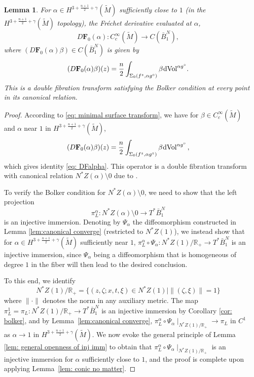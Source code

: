 \documentclass[11pt]{amsart}
\newtheorem{Lemma}[Theorem]{Lemma}
\theoremstyle{definition}
\numberwithin{equation}{section}
\newcommand{\mR}{\mathbb{R}}                    %
\newcommand{\s}{\hspace{0.5pt}}
\begin{document}
\begin{Lemma}\label{lem:bolkerstable}
	For $\alpha \in H^{3+\frac{n+1}{2}+\gamma}(\widetilde{M})$ sufficiently close to $1$ (in the $H^{3+\frac{n+1}{2}+\gamma}(\widetilde{M})$ topology), the Fr\'echet derivative evaluated at $\alpha$, 
    	$$D\mathbf{F}_0(\alpha): C_c^\infty(\widetilde{M}) \to C(\bar{B}_1^{N}),$$
where $\left(D\mathbf{F}_0(\alpha)\beta\right)\in C(\bar{B}_1^{N})$ is given by %
\begin{eqnarray}\label{eq: DFalpha}
(D\mathbf{F}_0(\alpha)\beta)(z) = \frac{n}{2} \int_{\Sigma_0(f^z,\alpha g^\circ)} \beta \s {\rm dVol}^{\alpha g^\circ}.
\end{eqnarray}
This is a double fibration transform satisfying the Bolker condition at every point in its canonical relation.
\end{Lemma}
\begin{proof}
According to \eqref{eq: minimal surface transform}, we have for $\beta \in C_c^\infty(\widetilde{M})$ and $\alpha$ near $1$ in $H^{3+\frac{n+1}{2}+\gamma}(\widetilde{M})$,
	\[
		(D\mathbf{F}_0(\alpha)\beta)(z) = \frac{n}{2} \int_{\Sigma_0(f^z,\alpha g^\circ)} \beta\s  {\rm dVol}^{\alpha g^\circ}\,,
	\]
which gives identity \eqref{eq: DFalpha}. This operator is a double fibration transform with canonical relation %
	$N^\ast Z(\alpha)\setminus 0$ due to \cite[Thm.~2.2]{MST}.%

	To verify the Bolker condition for $N^\ast Z(\alpha)\setminus 0$, we need to show that the left projection 
	$$\pi^\alpha_L \colon N^*Z(\alpha)\setminus 0 \to T^*\bar{B}_1^{N}$$
	is an injective immersion. Denoting by $\Psi_\alpha$ the diffeomorphism constructed in Lemma \ref{lem:canonical converge} (restricted to $N^*Z(1)$), we instead show that for $\alpha\in H^{3+\frac{n+1}{2}+\gamma}(\widetilde{M})$ sufficiently near $1$, $\pi^\alpha_L \circ \Psi_\alpha \colon N^*Z(1)/\mR_+ \to T^*\bar{B}_1^{N}$ is an injective immersion, since $\Psi_\alpha$ being a diffeomorphism that is homogeneous of degree $1$ in the fiber will then lead to the desired conclusion.

	To this end, we identify 
    $$N^*Z(1)/ \mathbb R_+ = \{(z,\zeta; x,t, \xi)\in N^*Z(1) \mid \|(\zeta,\xi)\|= 1\}$$
where $\|\cdot\|$ denotes the norm in any auxiliary metric. The map $\pi_L^1= \pi_L\colon N^*Z(1)/\mR_+ \to T^*\bar{B}_1^{N}$ is an injective immersion by Corollary \ref{cor: bolker}, and by Lemma~\ref{lem:canonical converge}, $\pi_L^\alpha\circ \Psi_\alpha \mid_{N^*Z(1)/ \mathbb R_+} \to \pi_L$ in $C^1$ as $\alpha\to 1$ in $H^{3+\frac{n+1}{2}+\gamma}(\widetilde{M})$. We now evoke the general principle of Lemma \ref{lem: general openness of inj imm} to obtain that $\pi_L^\alpha\circ \Psi_\alpha \mid_{N^*Z(1)/ \mathbb R_+}$ is an injective immersion for $\alpha$ sufficiently close to $1$, and the proof is complete upon applying Lemma~\ref{lem: conic no matter}.
\end{proof}
\end{document}
